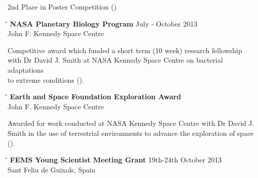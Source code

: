 \documentclass{res}
\begin{document}
\begin{resume}
\begin{tabbing}
   \end{tabbing}\vspace{-30pt}
   2nd Place in Poster Competition ()

   \vspace{-0.05in}  

  \begin{tabbing}
   \hspace{2in}\= \hspace{2.6in}\= \kill 
    {\bf NASA Planetary Biology Program} \> \>July - October 2013\\
                            \> 
                            \> John F. Kennedy Space Centre\\

   \end{tabbing}\vspace{-30pt}     
   Competitive award which funded a short term (10 week) research fellowship \\ with Dr David J. Smith at NASA Kennedy Space Centre on bacterial adaptations \\ to extreme conditions ().

   \vspace{-0.1in}  
 
   
   \begin{tabbing}
   \hspace{2in}\= \hspace{2.6in}\= \kill 
    {\bf Earth and Space Foundation Exploration Award} \> \\
                            \> 
                            \> John F. Kennedy Space Centre\\


   \end{tabbing}\vspace{-30pt}     
   Awarded for work conducted at NASA Kennedy Space Centre with Dr David J. \\ Smith in the use of terrestrial environments to advance the exploration of space ().

   \vspace{-0.1in}  
   
   \begin{tabbing}
   \hspace{2in}\= \hspace{2.6in}\= \kill 
    {\bf FEMS Young Scientist Meeting Grant} \> \> 19th-24th October 2013\\
                            \>  
                            \> Sant Feliu de Guixols, Spain \\
                       

\end{tabbing}
\end{resume}
\end{document}
